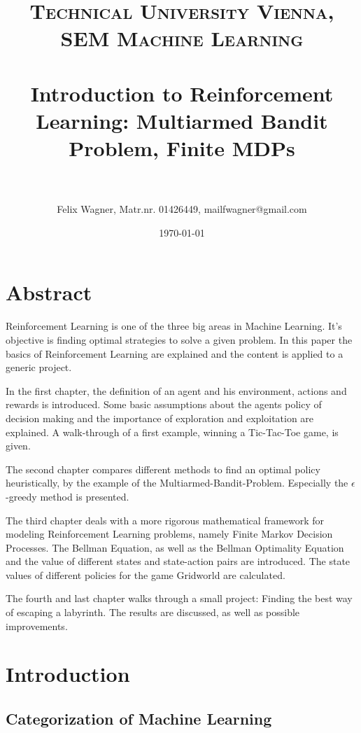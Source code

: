 \documentclass[paper=a4, fontsize=11pt]{scrartcl} %
\title{
\normalfont \normalsize
\textsc{Technical University Vienna, SEM Machine Learning} \\ [25pt] %
\horrule{0.5pt} \\[0.4cm] %
\huge Introduction to Reinforcement Learning: Multiarmed Bandit Problem, Finite MDPs  \\ %
\horrule{2pt} \\[0.5cm] %
}
\author{Felix Wagner, Matr.nr. 01426449, mailfwagner@gmail.com} %
\date{\normalsize\today} %
\numberwithin{equation}{section} %
\numberwithin{figure}{section} %
\numberwithin{table}{section} %
\begin{document}
\maketitle %


\section*{Abstract}

	Reinforcement Learning is one of the three big areas in Machine Learning. It's objective is finding optimal strategies to solve a given problem. In this paper the basics of Reinforcement Learning are explained and the content is applied to a generic project.

	In the first chapter, the definition of an agent and his environment, actions and rewards is introduced. Some basic assumptions about the agents policy of decision making and the importance of exploration and exploitation are explained. A walk-through of a first example, winning a Tic-Tac-Toe game, is given.

	The second chapter compares different methods to find an optimal policy heuristically, by the example of the Multiarmed-Bandit-Problem. Especially the $\epsilon$-greedy method is presented.

	The third chapter deals with a more rigorous mathematical framework for modeling Reinforcement Learning problems, namely Finite Markov Decision Processes. The Bellman Equation, as well as the Bellman Optimality Equation and the value of different states and state-action pairs are introduced. The state values of different policies for the game Gridworld are calculated.

	The fourth and last chapter walks through a small project: Finding the best way of escaping a labyrinth. The results are discussed, as well as possible improvements.
 

\section{Introduction}

\subsection{Categorization of Machine Learning}
\end{document}
